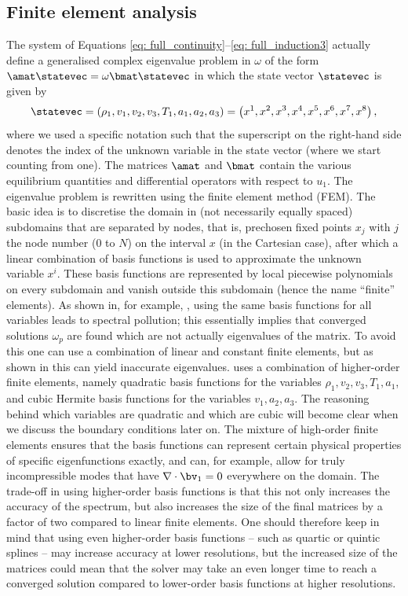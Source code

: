 \subsection{Finite element analysis} \label{ss: finite_elements}
The system of Equations \eqref{eq: full_continuity}--\eqref{eq: full_induction3} actually define a generalised complex eigenvalue problem in $\omega$ of the form $\amat \statevec = \omega \bmat \statevec$ in which the state vector $\statevec$ is given by
\begin{equation} \label{eq: statevector}
  \statevec = \left(\rho_1, v_1, v_2, v_3, T_1, a_1, a_2, a_3\right)
   = \left(x^1, x^2, x^3, x^4, x^5, x^6, x^7, x^8\right),
\end{equation}
where we used a specific notation such that the superscript on the right-hand side denotes the index of the unknown variable in the state vector (where we start counting from one). The matrices $\amat$ and $\bmat$ contain the various equilibrium quantities and differential operators with respect to $u_1$. The eigenvalue problem is rewritten using the finite element method (\gls{FEM}). The basic idea is to discretise the domain in (not necessarily equally spaced) subdomains that are separated by nodes, that is, prechosen fixed points $x_j$ with $j$ the node number ($0$ to $N$) on the interval $x$ (in the Cartesian case), after which a linear combination of basis functions is used to approximate the unknown variable $x^i$. These basis functions are represented by local piecewise polynomials on every subdomain and vanish outside this subdomain (hence the name ``finite'' elements). As shown in, for example, \citet{rappaz1977}, using the same basis functions for all variables leads to spectral pollution; this essentially implies that converged solutions $\omega_p$ are found which are not actually eigenvalues of the matrix. To avoid this one can use a combination of linear and constant finite elements, but as shown in \citet{kerner1985} this can yield inaccurate eigenvalues.
{\legolas} uses a combination of higher-order finite elements, namely quadratic basis functions for the variables $\rho_1, v_2, v_3, T_1, a_1$, and cubic Hermite basis functions for the variables $v_1, a_2, a_3$. The reasoning behind which variables are quadratic and which are cubic will become clear when we discuss the boundary conditions later on. The mixture of high-order finite elements ensures that the basis functions can represent certain physical properties of specific eigenfunctions exactly, and can, for example, allow for truly incompressible modes that have $\nabla \cdot \bv_1 = 0$ everywhere on the domain. The trade-off in using higher-order basis functions is that this not only increases the accuracy of the spectrum, but also increases the size of the final matrices by a factor of two compared to linear finite elements. One should therefore keep in mind that using even higher-order basis functions -- such as quartic or quintic splines -- may increase accuracy at lower resolutions, but the increased size of the matrices could mean that the solver may take an even longer time to reach a converged solution compared to lower-order basis functions at higher resolutions.


